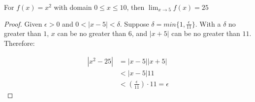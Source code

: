 
\begin{theorem}
  For $f(x)=x^2$ with domain $0 \le x \le 10$, then $\lim_{x \to 5}f(x)=25$
\end{theorem}

\begin{proof}
  Given $\epsilon > 0$ and $0<|x-5|<\delta$. Suppose $\delta =
  min\{1,\frac{\epsilon}{11}\}$. With a $\delta$ no greater than $1$,
  $x$ can be no greater than $6$, and $|x+5|$ can be no greater than $11$.
  Therefore:

  \begin{align*}
    |x^2-25| &=|x-5||x+5|\\
             &<|x-5|11\\
             &<(\frac{\epsilon}{11})\cdot 11=\epsilon
  \end{align*}
\end{proof}
